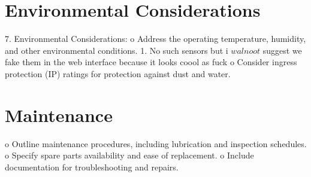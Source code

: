 \documentclass[a4paper]{article}
\begin{document}
\section*{Environmental Considerations}
7.	Environmental Considerations:
o	Address the operating temperature, humidity, and other environmental conditions.
1. No such sensors but i \(walnoot\) suggest we fake them in the web interface 		because it looks coool as fuck 
o	Consider ingress  protection (IP) ratings for protection against dust and water.
\section*{Maintenance}
o	Outline maintenance procedures, including lubrication and inspection schedules.
o	Specify spare parts availability and ease of replacement.
o	Include documentation for troubleshooting and repairs. 





\end{document}
